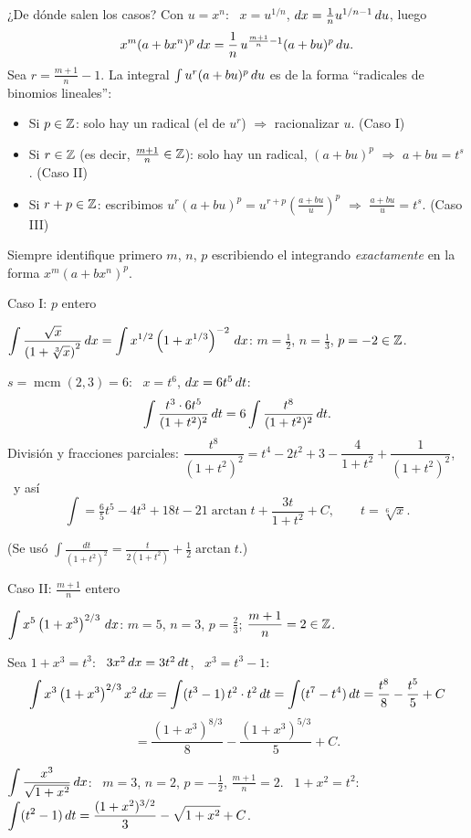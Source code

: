 \documentclass[10pt,aspectratio=169]{beamer}
\begin{document}
\begin{frame}{¿De dónde salen los casos?}
  Con $u=x^n$: \ $x=u^{1/n}$, $dx=\frac1nu^{1/n-1}\,du$, luego
  \[ x^m(a+bx^n)^p\,dx=\frac1n\,u^{\frac{m+1}{n}-1}(a+bu)^p\,du. \]
  Sea $r=\frac{m+1}{n}-1$. La integral $\int u^r(a+bu)^p\,du$ es de la forma ``radicales de binomios lineales'':
  \begin{itemize}
    \item Si $p\in\mathbb{Z}$: solo hay un radical (el de $u^r$) $\Rightarrow$ racionalizar $u$. \hfill(Caso I)
    \item Si $r\in\mathbb{Z}$ (es decir, $\frac{m+1}n\in\mathbb{Z}$): solo hay un radical, $(a+bu)^p$ $\Rightarrow$ $a+bu=t^s$. \hfill(Caso II)
    \item Si $r+p\in\mathbb{Z}$: escribimos $u^r(a+bu)^p=u^{r+p}\left(\frac{a+bu}{u}\right)^p$ $\Rightarrow$ $\frac{a+bu}{u}=t^s$. \hfill(Caso III)
  \end{itemize}
  \begin{observacion}
    Siempre identifique primero $m$, $n$, $p$ escribiendo el integrando \emph{exactamente} en la forma $x^m(a+bx^n)^p$.
  \end{observacion}
\end{frame}

\begin{frame}{Caso I: $p$ entero}
  \begin{ejemplo}[2]
    $\displaystyle\int\frac{\sqrt x}{\left(1+\sqrt[3]x\right)^2}\,dx=\int x^{1/2}\left(1+x^{1/3}\right)^{-2}\,dx$: \quad
    $m=\tfrac12$, $n=\tfrac13$, $p=-2\in\mathbb{Z}$.

    $s=\operatorname{mcm}(2,3)=6$: \ $x=t^6$, $dx=6t^5\,dt$:
    \[ \int\frac{t^3\cdot6t^5}{(1+t^2)^2}\,dt=6\int\frac{t^8}{(1+t^2)^2}\,dt. \]
    División y fracciones parciales:
    $\dfrac{t^8}{(1+t^2)^2}=t^4-2t^2+3-\dfrac{4}{1+t^2}+\dfrac{1}{(1+t^2)^2}$, \ y así
    \[ \int=\tfrac65t^5-4t^3+18t-21\arctan t+\frac{3t}{1+t^2}+C,\qquad t=\sqrt[6]x. \]
  \end{ejemplo}
  \small (Se usó $\int\frac{dt}{(1+t^2)^2}=\frac{t}{2(1+t^2)}+\frac12\arctan t$.)
\end{frame}

\begin{frame}{Caso II: $\frac{m+1}{n}$ entero}
  \begin{ejemplo}[3]
    $\displaystyle\int x^5\left(1+x^3\right)^{2/3}\,dx$: \quad $m=5$, $n=3$, $p=\tfrac23$; \quad $\dfrac{m+1}n=2\in\mathbb{Z}$.

    Sea $1+x^3=t^3$: \ $3x^2\,dx=3t^2\,dt$, \ $x^3=t^3-1$:
    \[ \int x^3\left(1+x^3\right)^{2/3}x^2\,dx=\int(t^3-1)\,t^2\cdot t^2\,dt=\int(t^7-t^4)\,dt=\frac{t^8}{8}-\frac{t^5}{5}+C \]
    \[ =\frac{(1+x^3)^{8/3}}{8}-\frac{(1+x^3)^{5/3}}{5}+C. \]
  \end{ejemplo}
  \begin{ejemplo}[4]
    $\displaystyle\int\frac{x^3}{\sqrt{1+x^2}}\,dx$: \ $m=3$, $n=2$, $p=-\tfrac12$, $\frac{m+1}n=2$. \ $1+x^2=t^2$:
    $\displaystyle\int(t^2-1)\,dt=\frac{(1+x^2)^{3/2}}{3}-\sqrt{1+x^2}+C$.
  \end{ejemplo}
\end{frame}
\end{document}
